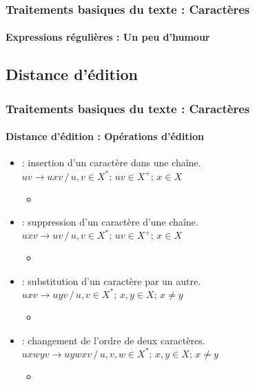 \documentclass[xcolor=table]{beamer}
\begin{document}
\begin{frame}
\frametitle{Traitements basiques du texte : Caractères}
\framesubtitle{Expressions régulières : Un peu d'humour}

\begin{center}
\end{center}

\end{frame}

\subsection{Distance d'édition}

\begin{frame}
\frametitle{Traitements basiques du texte : Caractères}
\framesubtitle{Distance d'édition : Opérations d'édition}

\begin{itemize}
	\item {} : insertion d'un caractère dans une chaîne.\\
	$uv \rightarrow uxv \,/\, u, v \in X^*;\, uv \in X^+;\, x \in X$
	\begin{itemize}
		\item {}
	\end{itemize}
	
	\item {} : suppression d'un caractère d'une chaîne.\\
	$uxv \rightarrow uv \,/\, u, v \in X^*;\, uv \in X^+;\, x \in X$
	\begin{itemize}
		\item {}
	\end{itemize}
	
	\item {} : substitution d'un caractère par un autre.\\
	$uxv \rightarrow uyv \,/\, u, v \in X^*;\, x, y \in X;\, x \ne y$
	\begin{itemize}
		\item {}
	\end{itemize}
	
	\item {} : changement de l'ordre de deux caractères.\\
	$uxwyv \rightarrow uywxv \,/\, u, v, w \in X^*;\, x, y \in X;\, x \ne y$
	\begin{itemize}
		\item {}
	\end{itemize}
\end{itemize}

\end{frame}
\end{document}
